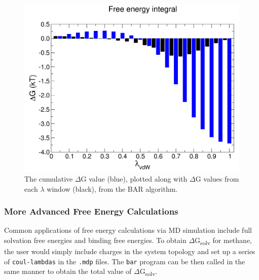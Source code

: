 \documentclass[9pt,tutorial]{livecoms}
\begin{document}
\begin{figure}[h!]
\centering
\includegraphics{free_energy_plot_barint}
\caption{The cumulative $\Delta$G value (blue), plotted along with $\Delta$G values from each $\lambda$ window (black), from the BAR algorithm.}
\label{free_energy_plot_barint_fig}
\end{figure}

\subsubsection{More Advanced Free Energy Calculations} \label{fes_advanced}

Common applications of free energy calculations via MD simulation include full solvation free energies and binding free energies. To obtain $\Delta$G\textsubscript{solv} for methane, the user would simply include charges in the system topology and set up a series of \texttt{coul-lambdas} in the \texttt{.mdp} files. The \texttt{bar} program can be then called in the same manner to obtain the total value of $\Delta$G\textsubscript{solv}.
\end{document}
